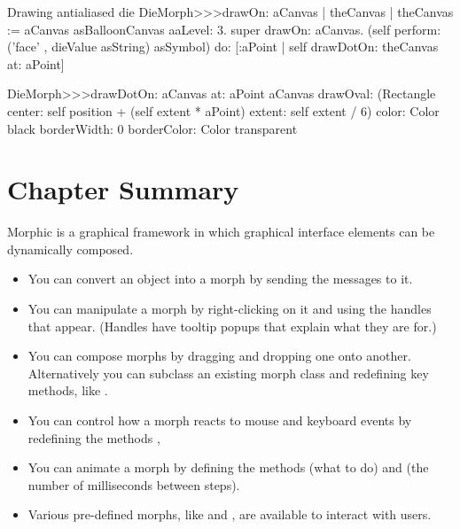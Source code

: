 \documentclass[a4paper,10pt,twoside]{book}
\begin{document}
\begin{methods}[aadie]{Drawing antialiased die}
DieMorph>>>drawOn: aCanvas
   | theCanvas |
   theCanvas := aCanvas asBalloonCanvas aaLevel: 3.
   super drawOn: aCanvas.
   (self perform: ('face' , dieValue asString) asSymbol)
      do: [:aPoint | self drawDotOn: theCanvas at: aPoint]

DieMorph>>>drawDotOn: aCanvas at: aPoint
   aCanvas
      drawOval: (Rectangle
         center: self position + (self extent * aPoint)
         extent: self extent / 6)
      color: Color black
      borderWidth: 0
      borderColor: Color transparent
\end{methods}

\section{Chapter Summary}

Morphic is a graphical framework in which graphical interface elements can be dynamically composed.

\begin{itemize}
  \item You can convert an object into a morph by sending the messages  to it.
  \item You can manipulate a morph by right-clicking on it and using the handles that appear. (Handles have tooltip popups that explain what they are for.)
  \item You can compose morphs by dragging and dropping one onto another.
  Alternatively you can subclass an existing morph class and redefining key methods, like .
  \item You can control how a morph reacts to mouse and keyboard events by redefining the methods , \etc
  \item You can animate a morph by defining the methods  (what to do) and  (the number of milliseconds between steps).
  \item Various pre-defined morphs, like  and , are available to interact with users.
\end{itemize}

\ifx\wholebook\relax\else
\end{document}
